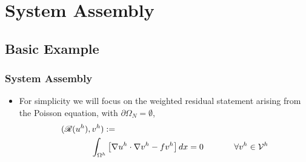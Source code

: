 \section{System Assembly}

\subsection{Basic Example}
    
\begin{frame}%
  \frametitle{System Assembly}
  \begin{itemize}
  \item {For simplicity we will focus on the weighted
    residual statement arising from the Poisson equation,
    with $\partial \Omega_N = \emptyset$, 
    \begin{eqnarray}
      \nonumber
      (\R( u^h ), v^h) := \hspace{2.5in} \\  \nonumber
      \int_{\Omega^h}  \left[ \nabla u^h \cdot \nabla v^h - fv^h \right] dx %
      =0 \hspace{.5in} \forall v^{h} \in \mathcal{V}^{h}
    \end{eqnarray}
  }
  \end{itemize}
\end{frame}


